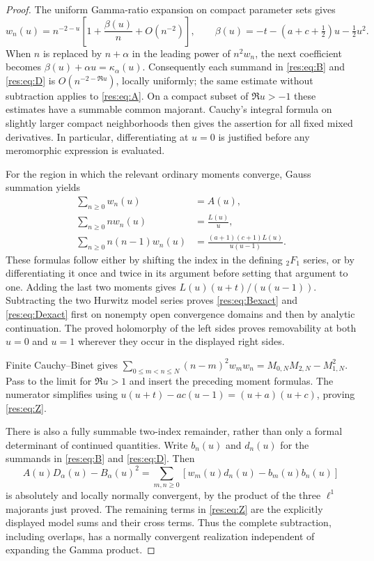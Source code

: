\documentclass[11pt,letterpaper]{article}
\numberwithin{equation}{section}
\theoremstyle{plain}
\theoremstyle{definition}
\theoremstyle{remark}
\begin{document}
\begin{proof}
The uniform Gamma-ratio expansion on compact parameter sets
\cite[Section 5.11(iii)]{DLMF} gives
\[
 w_n(u)=n^{-2-u}\left[1+\frac{\beta(u)}n+O(n^{-2})\right],\qquad
 \beta(u)=-t-(a+c+\tfrac12)u-\tfrac12u^2.
\]
When $n$ is replaced by $n+\alpha$ in the leading power of $n^2w_n$,
the next coefficient becomes $\beta(u)+\alpha u=\kappa_\alpha(u)$.
Consequently each summand in \eqref{res:eq:B} and \eqref{res:eq:D}
is $O(n^{-2-\Re u})$, locally uniformly; the same estimate without
subtraction applies to \eqref{res:eq:A}.  On a compact subset of
$\Re u>-1$ these estimates have a summable common majorant.
Cauchy's integral formula on slightly larger compact neighborhoods
then gives the assertion for all fixed mixed derivatives.  In
particular, differentiating at $u=0$ is justified before any
meromorphic expression is evaluated.

For the region in which the relevant ordinary moments converge,
Gauss summation \cite[Equation 15.4.20]{DLMF} yields
\begin{align*}
 \sum_{n\geq0}w_n(u)&=A(u),\\
 \sum_{n\geq0}nw_n(u)&=\frac{L(u)}u,\\
 \sum_{n\geq0}n(n-1)w_n(u)
    &=\frac{(a+1)(c+1)L(u)}{u(u-1)}.
\end{align*}
These formulas follow either by shifting the index in the defining
${}_2F_1$ series, or by differentiating it once and twice in its
argument before setting that argument to one.  Adding the last two
moments gives $L(u)(u+t)/(u(u-1))$.  Subtracting the two Hurwitz model
series proves \eqref{res:eq:Bexact} and \eqref{res:eq:Dexact} first on
nonempty open convergence domains and then by analytic continuation.
The proved holomorphy of the left sides proves removability at both
$u=0$ and $u=1$ wherever they occur in the displayed right sides.

Finite Cauchy--Binet gives
$\sum_{0\leq m<n\leq N}(n-m)^2w_mw_n=M_{0,N}M_{2,N}-M_{1,N}^2$.
Pass to the limit for $\Re u>1$ and insert the preceding moment
formulas.  The numerator simplifies using
$u(u+t)-ac(u-1)=(u+a)(u+c)$, proving \eqref{res:eq:Z}.

There is also a fully summable two-index remainder, rather than only
a formal determinant of continued quantities.  Write $b_n(u)$ and
$d_n(u)$ for the summands in \eqref{res:eq:B} and \eqref{res:eq:D}.
Then
\[
 A(u)D_\alpha(u)-B_\alpha(u)^2
 =\sum_{m,n\geq0}\left[w_m(u)d_n(u)-b_m(u)b_n(u)\right]
\]
is absolutely and locally normally convergent, by the product of
the three $\ell^1$ majorants just proved.  The remaining terms in
\eqref{res:eq:Z} are the explicitly displayed model sums and their
cross terms.  Thus the complete subtraction, including overlaps,
has a normally convergent realization independent of expanding
the Gamma product.
\end{proof}
\end{document}
